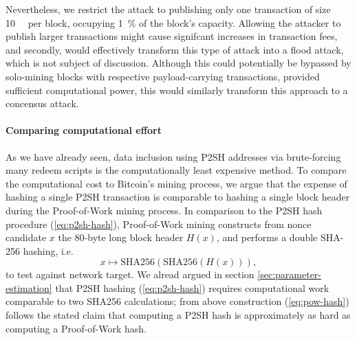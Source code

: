 \documentclass[10pt,a4paper,twocolumn]{article}
\begin{document}
Nevertheless, we restrict the attack to publishing only one transaction of size \SI{10}{\kilo\byte} per block, occupying \SI{1}{\percent} of the block's capacity.
Allowing the attacker to publish larger transactions might cause signifcant increases in transaction fees, and secondly, would effectively transform this type of attack into a flood attack, which is not subject of discussion.
Although this could potentially be bypassed by solo-mining blocks with respective payload-carrying transactions, provided sufficient computational power, this would similarly transform this approach to a concensus attack.

\paragraph{Comparing computational effort}
As we have already seen, data inclusion using {P2SH} addresses via brute-forcing many redeem scripts is the computationally least expensive method.
To compare the computational cost to Bitcoin's mining process, we argue that the expense of hashing a single {P2SH} transaction is comparable to hashing a single block header during the Proof-of-Work mining process.
%
In comparison to the P2SH hash procedure (\ref{eq:p2sh-hash}), Proof-of-Work mining constructs from nonce candidate $x$ the 80-byte long block header $H(x)$, and performs a double SHA-256 hashing, i.e. 
\begin{equation}
    x \mapsto \text{{SHA256}}(\text{{SHA256}}(H(x))),\label{eq:pow-hash}
\end{equation}
to test against network target.
We alread argued in section \ref{sec:parameter-estimation} that P2SH hashing (\ref{eq:p2sh-hash}) requires computational work comparable to two SHA256 calculations; from above construction (\ref{eq:pow-hash}) follows the stated claim that computing a P2SH hash is approximately as hard as computing a Proof-of-Work hash.
\end{document}
